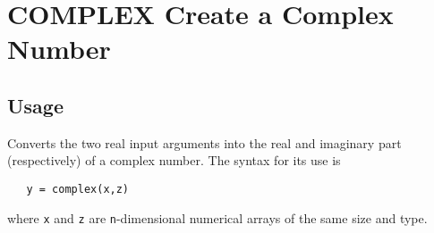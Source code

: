 \section{COMPLEX Create a Complex Number}

\subsection{Usage}

Converts the two real input arguments into the real and imaginary part
(respectively) of a complex number.  The syntax
for its use is
\begin{verbatim}
   y = complex(x,z)
\end{verbatim}
where \verb|x| and \verb|z| are \verb|n|-dimensional numerical arrays of the same size and type.  

